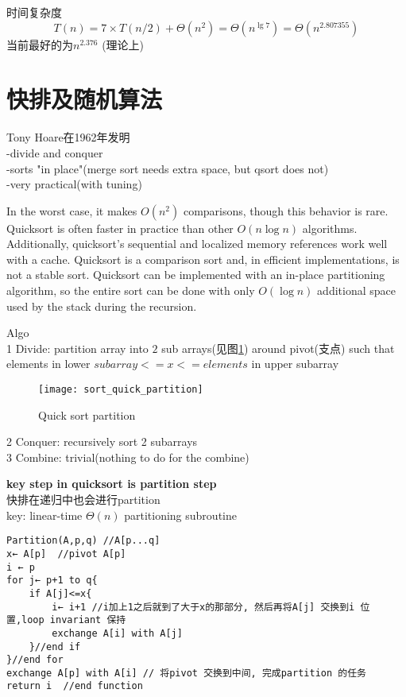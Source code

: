 \documentclass{article}
\begin{document}
时间复杂度
$$T(n)=7 \times T(n/2) + \Theta(n^2)=\Theta(n^{\lg7})=\Theta(n^{2.807355})$$
当前最好的为$n^{2.376}$  (理论上)

\section{快排及随机算法}
Tony Hoare在1962年发明\\
-divide and conquer\\
-sorts "in place"(merge sort needs extra space, but qsort does not)\\
-very practical(with tuning)

In the worst case, it makes $O(n^2)$ comparisons, though this behavior is rare. Quicksort is often faster in practice than other $O(n \log n)$ algorithms.\\
Additionally, quicksort's sequential and localized memory references work well with a cache.
Quicksort is a comparison sort and, in efficient implementations, is not a stable sort. Quicksort can be implemented with an in-place partitioning algorithm,
so the entire sort can be done with only $O(\log n)$ additional space used by the stack during the recursion.

Algo\\
1 Divide: partition array into $2$ sub arrays(见图\ref{fig.sort.quick.partition}) around pivot(支点) such that elements in lower $subarray<= x<=elements$ in upper subarray\\
\begin{figure}[htbp]
  \centering
  \texttt{[image: sort\_quick\_partition]}\\
  \caption{Quick sort partition}\label{fig.sort.quick.partition}
\end{figure}
2 Conquer: recursively sort 2 subarrays\\
3 Combine: trivial(nothing to do for the combine)

\textbf{key step in quicksort is partition step}\\
快排在递归中也会进行partition\\
key: linear-time $\Theta(n)$ partitioning subroutine
\begin{verbatim}
Partition(A,p,q) //A[p...q]
x← A[p]  //pivot A[p]
i ← p
for j← p+1 to q{
    if A[j]<=x{
		i← i+1 //i加上1之后就到了大于x的那部分, 然后再将A[j] 交换到i 位置,loop invariant 保持
		exchange A[i] with A[j]
    }//end if
}//end for
exchange A[p] with A[i] // 将pivot 交换到中间, 完成partition 的任务
return i  //end function
\end{verbatim}
\end{document}
